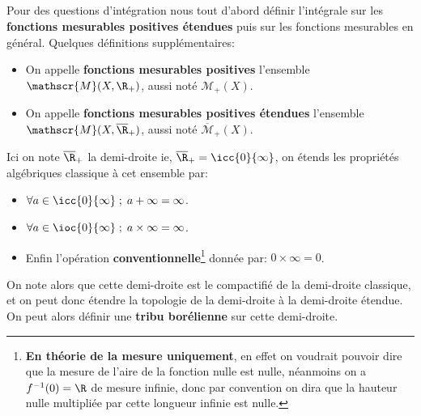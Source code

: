 \subsection*{}
Pour des questions d'intégration nous tout d'abord définir l'intégrale sur les \textbf{fonctions mesurables positives étendues} puis sur les fonctions mesurables en général. Quelques définitions supplémentaires:
\begin{itemize}
   \item On appelle \textbf{fonctions mesurables positives} l'ensemble \(\mathscr{M}(X, \R_+)\), aussi noté \(\mathscr{M}_+(X)\).
   \item On appelle  \textbf{fonctions mesurables positives étendues} l'ensemble \(\mathscr{M}(X, \overline{\R}_+)\), aussi noté \(\overline{\mathscr{M}}_+(X)\).
\end{itemize}
Ici on note \(\overline{\R}_+\) la demi-droite ie, \(\overline{\R}_+ = \icc{0}{\infty}\), on étends les propriétés algébriques classique à cet ensemble par:
\begin{itemize}
   \item \(\forall a \in \icc{0}{\infty} \; ; \; a + \infty = \infty\).
   \item \(\forall a \in \ioc{0}{\infty} \; ; \; a \times \infty = \infty\).
   \item Enfin l'opération \textbf{conventionnelle}\footnote[2]{\textbf{En théorie de la mesure uniquement}, en effet on voudrait pouvoir dire que la mesure de l'aire de la fonction nulle est nulle, néanmoins on a \(f^{-1}(0) = \R\) de mesure infinie, donc par convention on dira que la hauteur nulle multipliée par cette longueur infinie est nulle.} donnée par:  \(0 \times \infty = 0\).
\end{itemize}
On note alors que cette demi-droite est le compactifié de la demi-droite classique, et on peut donc étendre la topologie de la demi-droite à la demi-droite étendue. On peut alors définir une \textbf{tribu borélienne} sur cette demi-droite.
